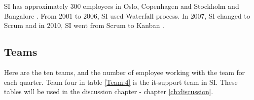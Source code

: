 \documentclass[UKenglish]{ifimaster}  %
\begin{document}
SI has approximately 300 employees in Oslo, Copenhagen and Stockholm and Bangalore \parencite{SI}. From 2001 to 2006, SI used Waterfall process. In 2007, SI changed to Scrum and in 2010, SI went from Scrum to Kanban \parencite{Dag}.

\subsection{Teams}
Here are the ten teams, and the number of employee working with the team for each quarter. Team four in table \ref{Team:4} is the it-support team in SI. These tables will be used in the discussion chapter - chapter \ref{ch:discussion}. 
\begin{table}[!htbp]
  \begin{adjustwidth}{-0cm}{}
\end{adjustwidth}
\end{table}
\end{document}
